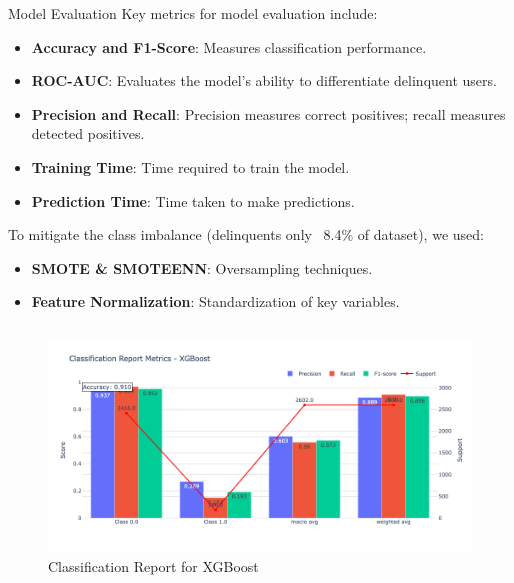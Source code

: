 \documentclass[final]{beamer}
\newlength{\colwidth}
\begin{document}
\begin{frame}[t]
\begin{columns}[t]
\begin{column}{\colwidth}
\begin{block}{Model Evaluation}
    Key metrics for model evaluation include:
    \begin{itemize}
        \item \textbf{Accuracy and F1-Score}: Measures classification performance.
        \item \textbf{ROC-AUC}: Evaluates the model's ability to differentiate delinquent users.
        \item \textbf{Precision and Recall}: Precision measures correct positives; recall measures detected positives.
        \item \textbf{Training Time}: Time required to train the model.
        \item \textbf{Prediction Time}: Time taken to make predictions.
    \end{itemize}
    To mitigate the class imbalance (delinquents only ~8.4\% of dataset), we used:
    \begin{itemize}
        \item \textbf{SMOTE \& SMOTEENN}: Oversampling techniques.
        \item \textbf{Feature Normalization}: Standardization of key variables.
    \end{itemize}

\vspace{1em}

\begin{columns}
\begin{column}{0.5\textwidth}  %
    \begin{center}
      \begin{figure}[H]
        \includegraphics[width=\textwidth]{figure/classification_report_xgboost.png}
        \caption{Classification Report for XGBoost}
        \label{fig:classification_report}
      \end{figure}
    \end{center}


\end{column}
\end{columns}
\end{block}
\end{column}
\end{columns}
\end{frame}
\end{document}
